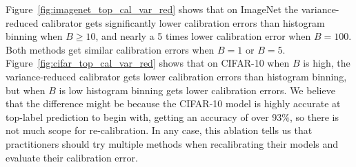 Figure~\ref{fig:imagenet_top_cal_var_red} shows that on ImageNet the variance-reduced calibrator gets significantly lower calibration errors than histogram binning when $B \geq 10$, and nearly a 5 times lower calibration error when $B = 100$. Both methods get similar calibration errors when $B = 1$ or $B = 5$. Figure~\ref{fig:cifar_top_cal_var_red} shows that on CIFAR-10 when $B$ is high, the variance-reduced calibrator gets lower calibration errors than histogram binning, but when $B$ is low histogram binning gets lower calibration errors. We believe that the difference might be because the CIFAR-10 model is highly accurate at top-label prediction to begin with, getting an accuracy of over $93\%$, so there is not much scope for re-calibration. In any case, this ablation tells us that practitioners should try multiple methods when recalibrating their models and evaluate their calibration error.
